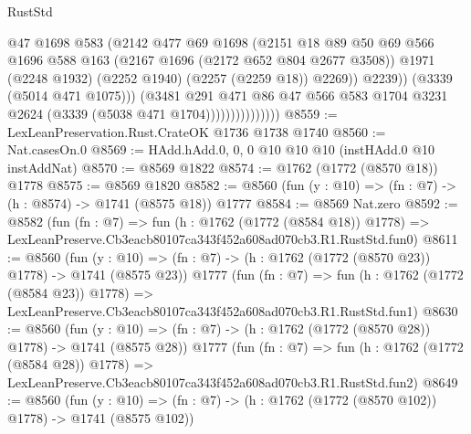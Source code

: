 \begin{lexlean}{RustStd}
\begin{coremodule}
                                  @47
                                  @1698
                                  @583
                                  (@2142
                                    @477
                                    @69
                                    @1698
                                    (@2151
                                      @18
                                      @89
                                      @50
                                      @69
                                      @566
                                      @1696
                                      @588
                                      @163
                                      (@2167 @1696 (@2172 @652 @804 @2677 @3508))
                                      @1971
                                      (@2248 @1932)
                                      (@2252 @1940)
                                      (@2257 (@2259 @18))
                                      @2269))
                                  @2239))
                              (@3339 (@5014 @471 @1075)))
                            (@3481
                              @291
                              @471
                              @86
                              @47
                              @566
                              @583
                              @1704
                              @3231
                              @2624
                              (@3339 (@5038 @471 @1704)))))))))))))))
@8559 := LexLeanPreservation.Rust.CrateOK @1736 @1738 @1740
@8560 := Nat.casesOn.{0}
@8569 := HAdd.hAdd.{0, 0, 0} @10 @10 @10 (instHAdd.{0} @10 instAddNat)
@8570 := @8569 @1822
@8574 := @1762 (@1772 (@8570 @18)) @1778
@8575 := @8569 @1820
@8582 := @8560 (fun (y : @10) => (fn : @7) -> (h : @8574) -> @1741 (@8575 @18)) @1777
@8584 := @8569 Nat.zero
@8592 := @8582
    (fun (fn : @7) =>
    fun (h : @1762 (@1772 (@8584 @18)) @1778) =>
    LexLeanPreserve.Cb3eacb80107ca343f452a608ad070cb3.R1.RustStd.fun0)
@8611 := @8560
    (fun (y : @10) => (fn : @7) -> (h : @1762 (@1772 (@8570 @23)) @1778) -> @1741 (@8575 @23))
    @1777
    (fun (fn : @7) =>
    fun (h : @1762 (@1772 (@8584 @23)) @1778) =>
    LexLeanPreserve.Cb3eacb80107ca343f452a608ad070cb3.R1.RustStd.fun1)
@8630 := @8560
    (fun (y : @10) => (fn : @7) -> (h : @1762 (@1772 (@8570 @28)) @1778) -> @1741 (@8575 @28))
    @1777
    (fun (fn : @7) =>
    fun (h : @1762 (@1772 (@8584 @28)) @1778) =>
    LexLeanPreserve.Cb3eacb80107ca343f452a608ad070cb3.R1.RustStd.fun2)
@8649 := @8560
    (fun (y : @10) => (fn : @7) -> (h : @1762 (@1772 (@8570 @102)) @1778) -> @1741 (@8575 @102))

\end{coremodule}
\end{lexlean}

